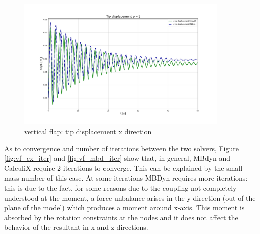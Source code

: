 \begin{figure}[htbp!]
	\centering
	\includegraphics[width=0.9\textwidth]{images/vert_flap/disp_rho1.png}
	\caption{vertical flap: tip displacement x direction}
	\label{fig:vf_displacement}
\end{figure}


As to convergence and number of iterations between the two solvers, Figure \ref{fig:vf_cx_iter} and \ref{fig:vf_mbd_iter} show that, in general, MBdyn and CalculiX require 2 iterations to converge. This can be explained by the small mass number of this case. At some iterations MBDyn requires more iterations: this is due to the fact, for some reasons due to the coupling not completely understood at the moment, a force unbalance arises in the y-direction (out of the plane of the model) which produces a moment around x-axis. This moment is absorbed by the rotation constraints at the nodes and it does not affect the behavior of the resultant in x and z directions. 

